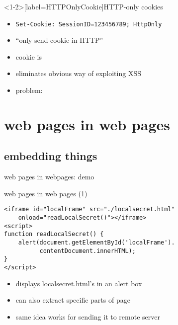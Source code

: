 
\begin{frame}<1-2>[label=HTTPOnlyCookie]{HTTP-only cookies}
    \begin{itemize}
    \item \texttt{Set-Cookie: SessionID=123456789; HttpOnly}
    \item ``only send cookie in HTTP''
    \item cookie is 
    \item eliminates obvious way of exploiting XSS
    \item problem: 
    \end{itemize}
\end{frame}



\section{web pages in web pages}

\subsection{embedding things}


\begin{frame}{web pages in webpages: demo}
\end{frame}

\begin{frame}[fragile,label=webInWeb]{web pages in web pages (1)}
    \vspace{-.25cm}
\begin{verbatim}
<iframe id="localFrame" src="./localsecret.html"
    onload="readLocalSecret()"></iframe>
<script>
function readLocalSecret() {
    alert(document.getElementById('localFrame').
          contentDocument.innerHTML);
}
</script>
\end{verbatim}
    \begin{itemize}
    \vspace{-.25cm}
    \item displays localsecret.html's  in an alert box
    \item can also extract specific parts of page
    \item same idea works for sending it to remote server
    \end{itemize}
\end{frame}

